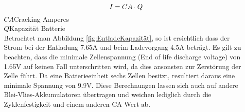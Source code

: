 \begin{equation}
\centering
I=CA \cdot Q
\label{eq:CA}
\end{equation}
$ CA $\quad 	Cracking Amperes      \\
$ Q $\qquad  Kapazität Batterie     \\

Betrachtet man Abbildung \ref{fig:EntladeKapazität}, so ist ersichtlich dass der Strom bei der Entladung 7.65A und beim Ladevorgang 4.5A beträgt.
Es gilt zu beachten, dass die minimale Zellenspannung (End of life discharge voltage) von 1.65V auf keinen Fall unterschritten wird, da dies ansonsten zur Zerstörung der Zelle führt. Da eine Batterieeinheit sechs Zellen besitzt, resultiert daraus eine minimale Spannung von 9.9V. Diese Berechnungen lassen sich auch auf andere Blei-Vlies-Akkumulatoren übertragen und weichen lediglich durch die Zyklenfestigkeit und einem anderen CA-Wert ab.